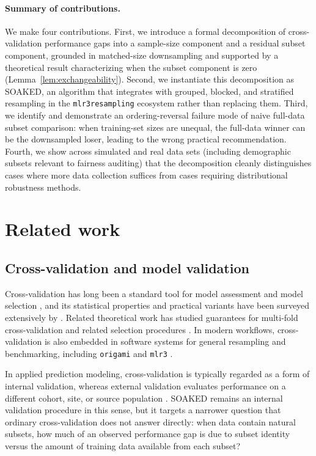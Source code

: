 \documentclass{article}
\begin{document}
\paragraph{Summary of contributions.}
We make four contributions.
First, we introduce a formal decomposition of cross-validation performance gaps into a sample-size component and a residual subset component, grounded in matched-size downsampling and supported by a theoretical result characterizing when the subset component is zero (Lemma~\ref{lem:exchangeability}).
Second, we instantiate this decomposition as SOAKED, an algorithm that integrates with grouped, blocked, and stratified resampling in the \texttt{mlr3resampling} ecosystem rather than replacing them.
Third, we identify and demonstrate an ordering-reversal failure mode of naive full-data subset comparison: when training-set sizes are unequal, the full-data winner can be the downsampled loser, leading to the wrong practical recommendation.
Fourth, we show across simulated and real data sets (including demographic subsets relevant to fairness auditing) that the decomposition cleanly distinguishes cases where more data collection suffices from cases requiring distributional robustness methods.




\section{Related work}

\subsection{Cross-validation and model validation}
Cross-validation has long been a standard tool for model assessment and model selection \citep{stone1974cross,geisser1975predictive}, and its statistical properties and practical variants have been surveyed extensively by \citet{Arl_Cel:2010:surveyCV,Arl:2016:JESchap3}.
Related theoretical work has studied guarantees for multi-fold cross-validation and related selection procedures \citep{vaart2006oracle}.
In modern workflows, cross-validation is also embedded in software systems for general resampling and benchmarking, including \texttt{origami} and \texttt{mlr3} \citep{coyle2018origami,Bischl2024}.

In applied prediction modeling, cross-validation is typically regarded as a form of internal validation, whereas external validation evaluates performance on a different cohort, site, or source population \citep{steyerberg2019,collins2015tripod}.
SOAKED remains an internal validation procedure in this sense, but it targets a narrower question that ordinary cross-validation does not answer directly: when data contain natural subsets, how much of an observed performance gap is due to subset identity versus the amount of training data available from each subset?
\end{document}
